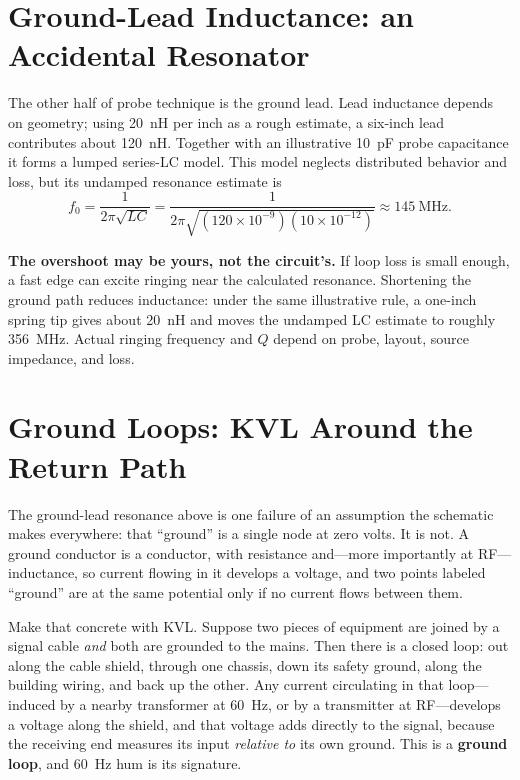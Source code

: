 \section{Ground-Lead Inductance: an Accidental Resonator}
The other half of probe technique is the ground lead. Lead inductance depends on
geometry; using \SI{20}{\nano\henry} per inch as a rough estimate, a six-inch lead
contributes about \SI{120}{\nano\henry}. Together with an illustrative
\SI{10}{\pico\farad} probe capacitance it forms a lumped series-LC model. This model
neglects distributed behavior and loss, but its undamped resonance estimate is
\[
f_0=\frac{1}{2\pi\sqrt{LC}}
=\frac{1}{2\pi\sqrt{(120\times10^{-9})(10\times10^{-12})}}
\approx\SI{145}{\mega\hertz}.
\]

\begin{physicalbox}
\textbf{The overshoot may be yours, not the circuit's.} If loop loss is small enough,
a fast edge can excite ringing near the calculated resonance. Shortening the ground
path reduces inductance: under the same illustrative rule, a one-inch spring tip gives
about \SI{20}{\nano\henry} and moves the undamped LC estimate to roughly
\SI{356}{\mega\hertz}. Actual ringing frequency and \(Q\) depend on probe, layout,
source impedance, and loss.
\end{physicalbox}

\section{Ground Loops: KVL Around the Return Path}
\label{sec:groundloops}
The ground-lead resonance above is one failure of an assumption the schematic makes
everywhere: that ``ground'' is a single node at zero volts. It is not. A ground
conductor is a conductor, with resistance and---more importantly at RF---inductance,
so current flowing in it develops a voltage, and two points labeled ``ground'' are
at the same potential only if no current flows between them.

Make that concrete with KVL. Suppose two pieces of equipment are joined by a signal
cable \emph{and} both are grounded to the mains. Then there is a closed loop:
out along the cable shield, through one chassis, down its safety ground, along the
building wiring, and back up the other. Any current circulating in that loop---
induced by a nearby transformer at \SI{60}{\hertz}, or by a transmitter at
RF---develops a voltage along the shield, and that voltage adds directly to the
signal, because the receiving end measures its input \emph{relative to} its own
ground. This is a \textbf{ground loop}, and \SI{60}{\hertz} hum is its signature.

